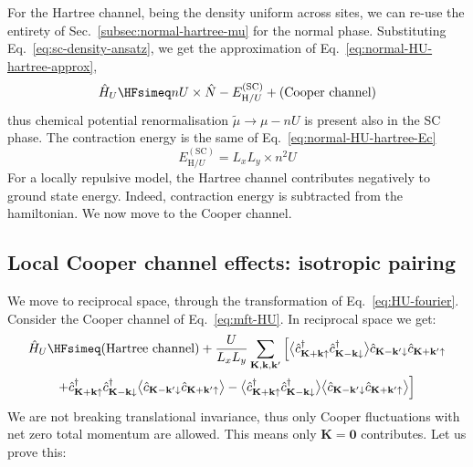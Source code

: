 For the Hartree channel, being the density uniform across sites, we can re-use the entirety of Sec.~\ref{subsec:normal-hartree-mu} for the normal phase. Substituting Eq.~\eqref{eq:sc-density-ansatz}, we get the approximation of Eq.~\eqref{eq:normal-HU-hartree-approx},
\begin{equation}\label{eq:sc-HU-approx}
	\hat H_U \HFsimeq nU \times \hat N - E_{\mathrm{H}/U}^{(\mathrm{SC})} + \text{(Cooper channel)}
\end{equation}
thus chemical potential renormalisation $\tilde{\mu} \to \mu - nU$ is present also in the SC phase. The contraction energy is the same of Eq.~\eqref{eq:normal-HU-hartree-Ec}
\begin{equation}\label{eq:sc-hartree-U-contraction-energy}
	E_{\mathrm{H}/U}^{(\mathrm{SC})} = L_x L_y \times n^2 U
\end{equation}
For a locally repulsive model, the Hartree channel contributes negatively to ground state energy. Indeed, contraction energy is subtracted from the hamiltonian. We now move to the Cooper channel.

\subsection{Local Cooper channel effects: isotropic pairing}\label{subsec:sc-l-cooper}

We move to reciprocal space, through the transformation of Eq.~\eqref{eq:HU-fourier}. Consider the Cooper channel of Eq.~\eqref{eq:mft-HU}. In reciprocal space we get:
\begin{multline}
	\hat H_U \HFsimeq \text{(Hartree channel)} + \frac{U}{L_x L_y}
	\sum_{\mathbf{K}, \mathbf{k}, \mathbf{k}'} \Big[
	\big\langle
	\hat c_{\mathbf{K}+\mathbf{k} \uparrow}^\dagger \hat c_{\mathbf{K}-\mathbf{k} \downarrow}^\dagger
	\big\rangle \hat c_{\mathbf{K}-\mathbf{k}' \downarrow} \hat c_{\mathbf{K}+\mathbf{k}' \uparrow} \\
	+ \hat c_{\mathbf{K}+\mathbf{k} \uparrow}^\dagger \hat c_{\mathbf{K}-\mathbf{k} \downarrow}^\dagger \big\langle
	\hat c_{\mathbf{K}-\mathbf{k}' \downarrow} \hat c_{\mathbf{K}+\mathbf{k}' \uparrow} 
	\big\rangle - \big\langle
	\hat c_{\mathbf{K}+\mathbf{k} \uparrow}^\dagger \hat c_{\mathbf{K}-\mathbf{k} \downarrow}^\dagger
	\big\rangle \big\langle 
	\hat c_{\mathbf{K}-\mathbf{k}' \downarrow} \hat c_{\mathbf{K}+\mathbf{k}' \uparrow}
	\big\rangle
	\Big] \label{eq:sc-mft-HU}
\end{multline}
We are not breaking translational invariance, thus only Cooper fluctuations with net zero total momentum are allowed. This means only $\mathbf{K}=\mathbf{0}$ contributes. Let us prove this: 

